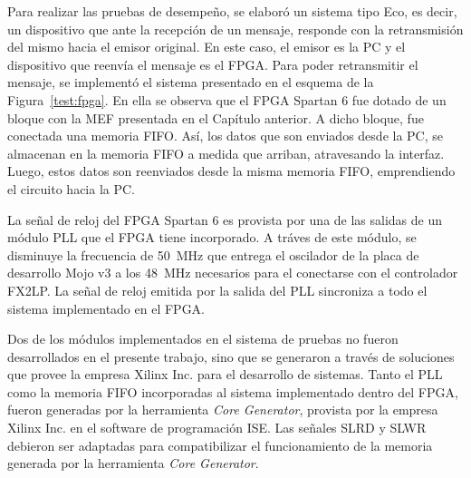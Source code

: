 Para realizar las pruebas de desempeño, se elaboró un sistema tipo Eco, es decir, un dispositivo que ante la recepción de un mensaje, responde con la retransmisión del mismo hacia el emisor original. En este caso, el emisor es la PC y el dispositivo que reenvía el mensaje es el FPGA. Para poder retransmitir el mensaje, se implementó el sistema presentado en el esquema de la Figura~\ref{test:fpga}. En ella se observa que el FPGA Spartan 6 fue dotado de un bloque con la MEF presentada en el Capítulo anterior. A dicho bloque, fue conectada una memoria FIFO. Así, los datos que son enviados desde la PC, se almacenan en la memoria FIFO a medida que arriban, atravesando la interfaz. Luego, estos datos son reenviados desde la misma memoria FIFO, emprendiendo el circuito hacia la PC.

La señal de reloj del FPGA Spartan 6 es provista por una de las salidas de un módulo PLL que el FPGA tiene incorporado. A tráves de este módulo, se disminuye la frecuencia de \SI{50}{\mega\hertz} que entrega el oscilador de la placa de desarrollo Mojo v3 a los \SI{48}{\mega\hertz} necesarios para el conectarse con el controlador FX2LP. La señal de reloj emitida por la salida del PLL sincroniza a todo el sistema implementado en el FPGA. 

Dos de los módulos implementados en el sistema de pruebas no fueron desarrollados en el presente trabajo, sino que se generaron a través de soluciones que provee la empresa Xilinx Inc. para el desarrollo de sistemas. Tanto el PLL como la memoria FIFO incorporadas al sistema implementado dentro del FPGA, fueron generadas por la herramienta \textit{Core Generator}, provista por la empresa Xilinx Inc. en el software de programación ISE. Las señales SLRD y SLWR debieron ser adaptadas para compatibilizar el funcionamiento de la memoria generada por la herramienta \textit{Core Generator}.


